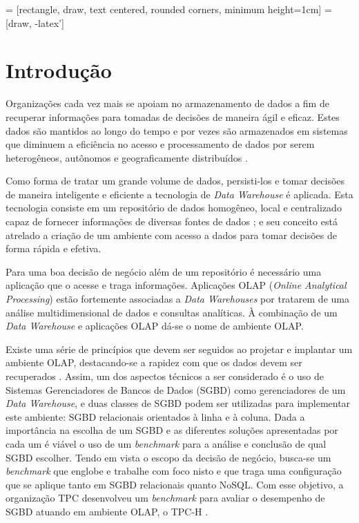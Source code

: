 \documentclass[conference]{IEEEtran}
\begin{document}
\IEEEpeerreviewmaketitle

 = [rectangle, draw, 
    text centered, rounded corners, minimum height=1cm]
 = [draw, -latex']


\section{Introdução}

Organizações cada vez mais se apoiam no armazenamento de dados a fim de recuperar informações para tomadas de decisões de maneira ágil e eficaz. Estes dados são mantidos ao longo do tempo e por vezes são armazenados em sistemas que diminuem a eficiência no acesso e processamento de dados por serem heterogêneos, autônomos e geograficamente distribuídos \cite{wrembel2007data}.

Como forma de tratar um grande volume de dados, persisti-los e tomar decisões de maneira inteligente e eficiente a tecnologia de \textit{Data Warehouse} é aplicada. Esta tecnologia consiste em um repositório de dados homogêneo, local e centralizado capaz de fornecer informações de diversas fontes de dados \cite{wrembel2007data}; e seu conceito está atrelado a criação de um ambiente com acesso a dados para tomar decisões de forma rápida e efetiva.

Para uma boa decisão de negócio além de um repositório é necessário uma aplicação que o acesse e traga informações. Aplicações OLAP (\textit{Online Analytical Processing}) estão fortemente associadas a \textit{Data Warehouses} por tratarem de uma análise multidimensional de dados e consultas analíticas. À combinação de um \textit{Data Warehouse} e aplicações OLAP dá-se o nome de ambiente OLAP.

Existe uma série de princípios que devem ser seguidos ao projetar e implantar um ambiente OLAP, destacando-se a rapidez com que os dados devem ser recuperados \cite{codd1998providing, kimball2002dw, wrembel2007data}. Assim, um dos aspectos técnicos a ser considerado é o uso de Sistemas Gerenciadores de Bancos de Dados (SGBD) como gerenciadores de um \textit{Data Warehouse}, e duas classes de SGBD podem ser utilizadas para implementar este ambiente: SGBD relacionais orientados à linha e à coluna. Dada a importância na escolha de um SGBD e as diferentes soluções apresentadas por cada um é viável o uso de um \textit{benchmark} para a análise e conclusão de qual SGBD escolher. Tendo em vista o escopo da decisão de negócio, busca-se um \textit{benchmark} que englobe e trabalhe com foco nisto e que traga uma configuração que se aplique tanto em SGBD relacionais quanto NoSQL. Com esse objetivo, a organização TPC \cite{tpc2017page} desenvolveu um \textit{benchmark} para avaliar o desempenho de SGBD atuando em ambiente OLAP, o TPC-H \cite{tpch2017page}. 
\end{document}

